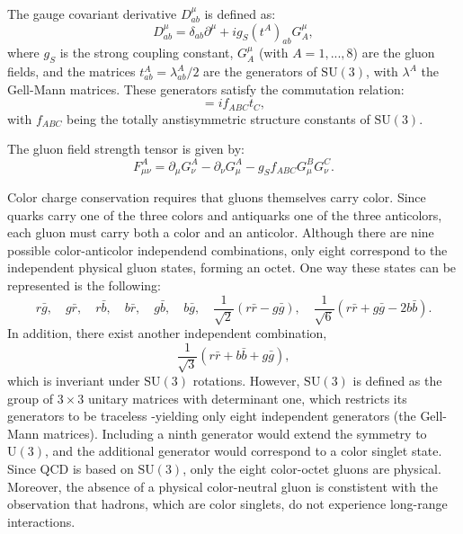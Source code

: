 The gauge covariant derivative $D^\mu_{ab}$ is defined as:
\begin{equation}
D^\mu_{ab}=\delta_{ab}\partial^\mu + ig_S (t^A)_{ab}G^\mu_A,
\end{equation}
where $g_S$ is the strong coupling constant, $G^\mu_A$ (with $A=1,...,8$) are the gluon fields, and the matrices $t^A_{ab}=\lambda^A_{ab}/2$ are the generators of $\mathrm{SU}(3)$, with $\lambda^A$ the Gell-Mann matrices. These generators satisfy the commutation relation:
\begin{equation}
[t_A,t_B]=if_{ABC}t_C,
\end{equation}
with $f_{ABC}$ being the totally anstisymmetric structure constants of $\mathrm{SU}(3)$.

The gluon field strength tensor is given by:
\begin{equation}
F_{\mu\nu}^A=\partial_\mu G_\nu^A - \partial_\nu G_\mu^A - g_S f_{ABC} G_\mu^B G_\nu^C.
\end{equation}

Color charge conservation requires that gluons themselves carry color. Since quarks carry one of the three colors and antiquarks one of the three anticolors, each gluon must carry both a color and an anticolor. Although there are nine possible color-anticolor independend combinations, only eight correspond to the independent physical gluon states, forming an octet. One way these states can be represented is the following:
\begin{equation}
r\bar{g}, \quad g\bar{r}, \quad r\bar{b}, \quad b\bar{r}, \quad g\bar{b}, \quad b\bar{g}, \quad \frac{1}{\sqrt{2}}(r\bar{r}-g\bar{g}), \quad \frac{1}{\sqrt{6}}(r\bar{r}+g\bar{g}-2b\bar{b}).
\end{equation}
In addition, there exist another independent combination,
\begin{equation}
\frac{1}{\sqrt{3}}(r\bar{r}+b\bar{b}+g\bar{g}),
\end{equation}
which is inveriant under $\mathrm{SU}(3)$ rotations. However, $\mathrm{SU}(3)$ is defined as the group of $3\times 3$ unitary matrices with determinant one, which restricts its generators to be traceless -yielding only eight independent generators (the Gell-Mann matrices). Including a ninth generator would extend the symmetry to $\mathrm{U}(3)$, and the additional generator would correspond to a color singlet state. Since QCD is based on $\mathrm{SU}(3)$, only the eight color-octet gluons are physical. Moreover, the absence of a physical color-neutral gluon is constistent with the observation that hadrons, which are color singlets, do not experience long-range interactions.

